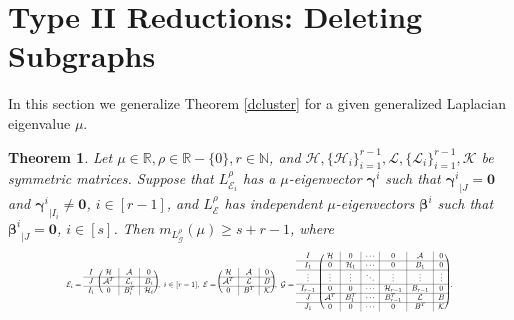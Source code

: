 \documentclass{amsart}
\newtheorem{theorem}{Theorem}
\theoremstyle{remark}
\begin{document}
\section{Type II Reductions: Deleting Subgraphs}
In this section we generalize  Theorem \ref{dcluster} for a given generalized Laplacian eigenvalue $\mu$.
\begin{theorem}\label{cluster}
Let $\mu\in \mathbb{R},\rho\in \mathbb{R}-\{0\},r\in\mathbb{N}$, and $\mathcal{H},\{\mathcal{H}_i\}_{i=1}^{r-1},\mathcal{L},\{\mathcal{L}_i\}_{i=1}^{r-1},\mathcal{K}$ be symmetric matrices. Suppose that $L_{\mathcal{E}_{i}}^{\rho}$ has a $\mu$-eigenvector $\pmb{\gamma}^{i}$ such that ${\pmb{\gamma}^{i}}_{|J}=\pmb{0}$ and ${\pmb{\gamma}^{i}}_{|I_{i}}\neq \pmb{0}$, $i\in [r-1]$, and $L_{\mathcal{E}}^{\rho}$ has independent $\mu$-eigenvectors $\pmb{\beta}^{i}$ such that ${\pmb{\beta}^{i}}_{|J}=\pmb{0}$, $i\in [s]$. Then $m_{L_{\mathcal{G}}^{\rho}}(\mu)\geq s+r-1$, where
\begin{equation*}
\resizebox{ 0.8\textwidth}{!} 
{$
\mathcal{E}_{i}=
\begin{blockarray}{cc|c|c}
\begin{block}{c(c|c|c)}
  I & \mathcal{H} &\mathcal{A}  &0  \\\cline{1-4}
  J & \mathcal{A}^{T}& \mathcal{L}_{i}&B_{i}\\\cline{1-4}
  I_{i} & 0& B_{i}^{T} & \mathcal{H}_{i} \\
\end{block}
\end{blockarray},\,\, i\in[r-1],\,\,
\mathcal{E}=
\begin{blockarray}{c|c|c}
\begin{block}{(c|c|c)}
  \mathcal{H} &\mathcal{A}  &0  \\\cline{1-3}
  \mathcal{A}^{T}& \mathcal{L}&B\\\cline{1-3}
 0& B^{T} & \mathcal{K} \\
\end{block}
\end{blockarray},\,\, 
\mathcal{G}=
\begin{blockarray}{cc|c|c|c|c|c}
\begin{block}{c(c|c|c|c|c|c)}
I & \mathcal{H}   & 0 &\cdots&0& \mathcal{A} &0 \\\cline{1-7}
I_{1} &0&  \mathcal{H}_{1} &  \cdots&0& B_{1} &0 \\\cline{1-7}
\vdots&\vdots& \vdots  &\ddots  &\vdots&\vdots&\vdots \\\cline{1-7}
I_{r-1} &  0 & 0 &  \cdots & \mathcal{H}_{r-1} &  B_{r-1}&0 \\\cline{1-7}
J& \mathcal{A}^{T} &   B_{1}^{T} &  \cdots& B_{r-1}^{T}& \mathcal{L} & B  \\\cline{1-7}
J_{1}& 0 &   0 &  \cdots& 0& B^{T}&\mathcal{K}  \\
\end{block}
\end{blockarray}\,.$}
\end{equation*}
\end{theorem}
\end{document}
